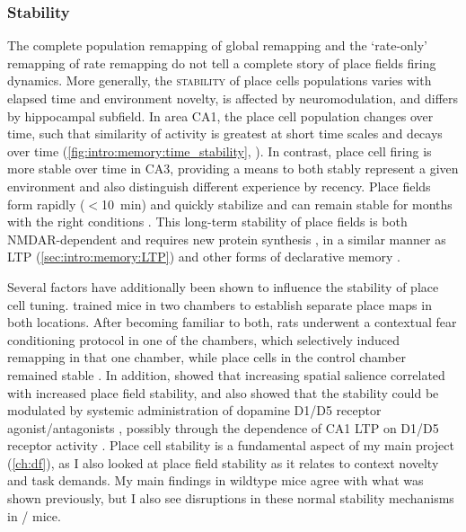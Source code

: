 \subsubsection{Stability}
\label{sec:intro:memory:stability}
The complete population remapping of global remapping and the `rate-only' remapping of rate remapping do not tell a complete story of place fields firing dynamics.
More generally, the \textsc{stability} of place cells populations varies with elapsed time and environment novelty, is affected by neuromodulation, and differs by hippocampal subfield.
In area CA1, the place cell population changes over time, such that similarity of activity is greatest at short time scales and decays over time (\autoref{fig:intro:memory:time_stability}, \citealp{Mankin2012}).
In contrast, place cell firing is more stable over time in CA3, providing a means to both stably represent a given environment and also distinguish different experience by recency.
Place fields form rapidly ($<$10~min) and quickly stabilize \citep{Frank2004} and can remain stable for months with the right conditions \citep{Thompson1990, Lever2002a, Ziv2013}.
This long-term stability of place fields is both \ac{NMDAR}-dependent \citep{McHugh1996, Kentros1998} and requires new protein synthesis \citep{Agnihotri2004}, in a similar manner as LTP (\autoref{sec:intro:memory:LTP}) and other forms of declarative memory \citep{Hernandez2008}.

Several factors have additionally been shown to influence the stability of place cell tuning.
\citeauthor{Moita2004} trained mice in two chambers to establish separate place maps in both locations.
After becoming familiar to both, rats underwent a contextual fear conditioning protocol in one of the chambers, which selectively induced remapping in that one chamber, while place cells in the control chamber remained stable \citep{Moita2004}.
In addition, \citeauthor{Kentros2004} showed that increasing spatial salience correlated with increased place field stability, and also showed that the stability could be modulated by systemic administration of dopamine D1/D5 receptor agonist/antagonists \citep{Kentros2004}, possibly through the dependence of CA1 LTP on D1/D5 receptor activity \citep{Huang1995}.
Place cell stability is a fundamental aspect of my main project (\autoref{ch:df}), as I also looked at place field stability as it relates to context novelty and task demands.
My main findings in wildtype mice agree with what was shown previously, but I also see disruptions in these normal stability mechanisms in \df/ mice.

